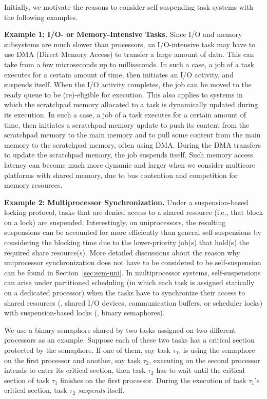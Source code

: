 \label{sec:examples}

Initially, we motivate the reasons to consider self-suspending task systems with the following examples.

{\bf Example 1: I/O- or Memory-Intensive Tasks.} Since I/O and memory subsystems are much slower than processors, an I/O-intensive task may have to use DMA (Direct Memory Access) to transfer a large amount of data. This can take from a few microseconds up to milliseconds. In such a case, a job of a task executes for a certain amount of time, then initiates an I/O activity, and suspends itself. When the I/O activity completes, the job can be moved to the ready queue to be (re)-eligible for execution. This also applies to systems in which the scratchpad memory allocated to a task is dynamically updated during its execution. In such a case, a job of a task executes for a certain amount of time, then initiates a scratchpad memory update to push its content from the scratchpad memory to the main memory and to pull some content from the main memory to the scratchpad memory, often using DMA. During the DMA transfers to update the scratchpad memory, the job suspends itself. Such memory access latency can become much more dynamic and larger when we consider multicore platforms with shared memory, due to bus contention and competition for memory resources.

{\bf Example 2: Multiprocessor Synchronization.} \hspace{0.1in}
Under a suspension-based locking protocol, tasks that are denied access to a shared resource (i.e., that block on a lock) are suspended. Interestingly, on uniprocessors, the resulting suspensions can be accounted for more efficiently than general self-suspensions by considering the blocking time due to the lower-priority job(s) that hold(s) the required share resource(s). More detailed discussions about the reason why uniprocessor synchronization does not have to be considered to be self-suspension can be found in Section~\ref{sec:sem-uni}. In multiprocessor systems, self-suspensions can arise under partitioned scheduling (in which each task is assigned statically on a dedicated processor) when the tasks have to synchronize their access to shared resources (\eg, shared I/O devices, communication buffers, or scheduler locks) with suspension-based locks (\eg, binary semaphores). 

We use a binary semaphore shared by two tasks assigned on two different processors as an example. Suppose each of these two tasks has a critical section protected by the semaphore. If one of them, say task $\tau_1$, is using the semaphore on the first processor and another, say task $\tau_2$, executing on the second processor intends to enter its critical section, then task $\tau_2$ has to wait until the critical section of task $\tau_1$ finishes on the first processor. During the execution of task $\tau_1$'s critical section, task $\tau_2$ \emph{suspends} itself. 

